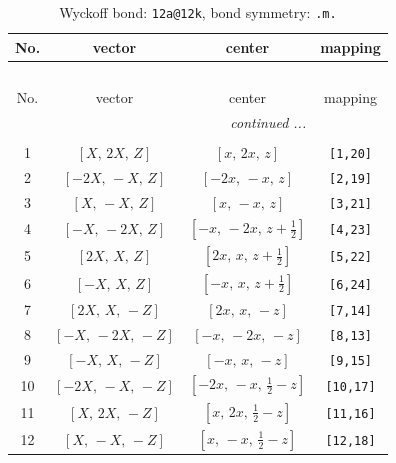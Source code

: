 \documentclass[fleqn,8pt]{jsarticle}
\begin{document}
\begin{longtable}{cccc}
\caption{Wyckoff bond: {\tt 12a@12k}, bond symmetry: {\tt .m.}}
 \\
 \hline \hline
No. & vector & center & mapping \\ \hline \endfirsthead

\multicolumn{3}{l}{\tablename\ \thetable{}} \\
 \hline \hline
No. & vector & center & mapping \\ \hline \endhead

 \hline \hline
\multicolumn{3}{r}{\footnotesize\it continued ...} \\ \endfoot

 \hline \hline
\multicolumn{3}{r}{} \\ \endlastfoot

1 & $\left[ X,\, 2 X,\, Z \right]$ & $\left[ x,\, 2 x,\, z \right]$ & {\tt [1,20]} \\ \hline
2 & $\left[ - 2 X,\, - X,\, Z \right]$ & $\left[ - 2 x,\, - x,\, z \right]$ & {\tt [2,19]} \\ \hline
3 & $\left[ X,\, - X,\, Z \right]$ & $\left[ x,\, - x,\, z \right]$ & {\tt [3,21]} \\ \hline
4 & $\left[ - X,\, - 2 X,\, Z \right]$ & $\left[ - x,\, - 2 x,\, z + \frac{1}{2} \right]$ & {\tt [4,23]} \\ \hline
5 & $\left[ 2 X,\, X,\, Z \right]$ & $\left[ 2 x,\, x,\, z + \frac{1}{2} \right]$ & {\tt [5,22]} \\ \hline
6 & $\left[ - X,\, X,\, Z \right]$ & $\left[ - x,\, x,\, z + \frac{1}{2} \right]$ & {\tt [6,24]} \\ \hline
7 & $\left[ 2 X,\, X,\, - Z \right]$ & $\left[ 2 x,\, x,\, - z \right]$ & {\tt [7,14]} \\ \hline
8 & $\left[ - X,\, - 2 X,\, - Z \right]$ & $\left[ - x,\, - 2 x,\, - z \right]$ & {\tt [8,13]} \\ \hline
9 & $\left[ - X,\, X,\, - Z \right]$ & $\left[ - x,\, x,\, - z \right]$ & {\tt [9,15]} \\ \hline
10 & $\left[ - 2 X,\, - X,\, - Z \right]$ & $\left[ - 2 x,\, - x,\, \frac{1}{2} - z \right]$ & {\tt [10,17]} \\ \hline
11 & $\left[ X,\, 2 X,\, - Z \right]$ & $\left[ x,\, 2 x,\, \frac{1}{2} - z \right]$ & {\tt [11,16]} \\ \hline
12 & $\left[ X,\, - X,\, - Z \right]$ & $\left[ x,\, - x,\, \frac{1}{2} - z \right]$ & {\tt [12,18]} \\
\end{longtable}
\end{document}
